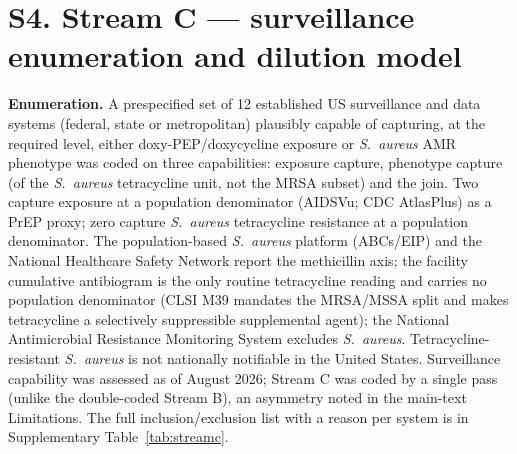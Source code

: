 \documentclass[11pt,a4paper]{article}
\newcommand{\sa}{\emph{S.~aureus}}
\begin{document}
\section*{S4. Stream C --- surveillance enumeration and dilution model}

\textbf{Enumeration.} A prespecified set of 12 established US surveillance and
data systems (federal, state or metropolitan) plausibly capable of capturing, at
the required level, either doxy-PEP/doxycycline exposure or \sa{} AMR phenotype was
coded on three capabilities: exposure capture, phenotype capture (of the \sa{}
tetracycline unit, not the MRSA subset) and the join. Two capture exposure at a
population denominator (AIDSVu; CDC AtlasPlus) as a PrEP proxy; zero capture \sa{}
tetracycline resistance at a population denominator. The population-based \sa{}
platform (ABCs/EIP) and the National Healthcare Safety Network report the
methicillin axis; the facility cumulative antibiogram is the only routine
tetracycline reading and carries no population denominator (CLSI M39 mandates the
MRSA/MSSA split and makes tetracycline a selectively suppressible supplemental
agent); the National Antimicrobial Resistance Monitoring System excludes \sa{}.
Tetracycline-resistant \sa{} is not nationally notifiable in the United States. Surveillance
capability was assessed as of August 2026; Stream C was coded by a single pass
(unlike the double-coded Stream B), an asymmetry noted in the main-text
Limitations. The full inclusion/exclusion list with a reason per system is in
Supplementary Table~\ref{tab:streamc}.
\end{document}
